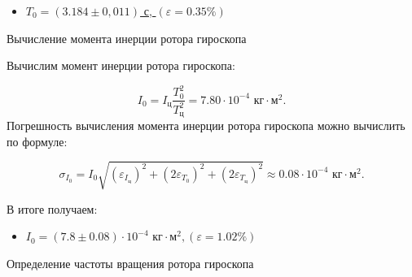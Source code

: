 \documentclass[12pt, a4paper]{article}
\begin{document}
\begin{itemize}
	\item \underline{$ T_0 = \left( 3.184 \pm 0,011 \right) $ с, $ \left( \varepsilon = 0.35 \% \right)  $}
\end{itemize}


{\large Вычисление момента инерции ротора гироскопа}

Вычислим момент инерции ротора гироскопа:

\begin{equation}
I_0=I_\text{ц}\frac{T_0^2}{T_\text{ц}^2} = 7.80 \cdot 10^{-4} \text{ кг} \cdot \text{м}^2.
\end{equation}
Погрешность вычисления момента инерции ротора гироскопа можно вычислить по формуле:

\begin{equation}
\sigma_{I_0} = I_0\sqrt{\left( \varepsilon_{I_\text{ц}} \right)^2 +\left( 2 \varepsilon_{T_0} \right)^2 + \left(2 \varepsilon_{T_\text{ц}} \right)^2} \approx 0.08 \cdot 10^{-4} \text{ кг} \cdot \text{м}^2.
\end{equation}

В итоге получаем: \label{inertion}

\begin{itemize}
	\item \underline{$ I_0 = \left( 7.8 \pm 0.08 \right) \cdot 10^{-4} \text{ кг} \cdot \text{м}^2, \left( \varepsilon = 1.02   \% \right) $}
\end{itemize}

{\large Определение частоты вращения ротора гироскопа}
\end{document}

